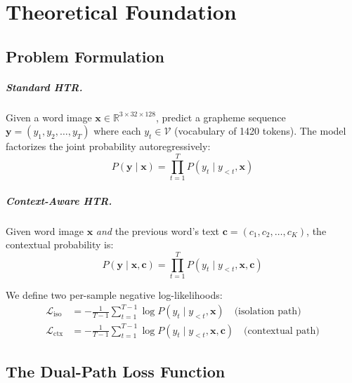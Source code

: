 \documentclass[11pt, a4paper]{report}
\begin{document}
\chapter{Theoretical Foundation}
\label{ch:theory}

\section{Problem Formulation}
\label{sec:problem}

\paragraph{Standard HTR.} Given a word image $\mathbf{x} \in \mathbb{R}^{3 \times 32 \times 128}$, predict a grapheme sequence $\mathbf{y} = (y_1, y_2, \ldots, y_T)$ where each $y_t \in \mathcal{V}$ (vocabulary of 1420 tokens). The model factorizes the joint probability autoregressively:
\begin{equation}
  P(\mathbf{y} \mid \mathbf{x}) = \prod_{t=1}^{T} P(y_t \mid y_{<t}, \mathbf{x})
\end{equation}

\paragraph{Context-Aware HTR.} Given word image $\mathbf{x}$ \emph{and} the previous word's text $\mathbf{c} = (c_1, c_2, \ldots, c_K)$, the contextual probability is:
\begin{equation}
  P(\mathbf{y} \mid \mathbf{x}, \mathbf{c}) = \prod_{t=1}^{T} P(y_t \mid y_{<t}, \mathbf{x}, \mathbf{c})
\end{equation}

We define two per-sample negative log-likelihoods:
\begin{align}
  \mathcal{L}_{\mathrm{iso}} &= -\frac{1}{T-1} \sum_{t=1}^{T-1} \log P(y_t \mid y_{<t}, \mathbf{x}) \quad \text{(isolation path)} \\
  \mathcal{L}_{\mathrm{ctx}} &= -\frac{1}{T-1} \sum_{t=1}^{T-1} \log P(y_t \mid y_{<t}, \mathbf{x}, \mathbf{c}) \quad \text{(contextual path)}
\end{align}

\section{The Dual-Path Loss Function}
\label{sec:loss-function}
\end{document}
